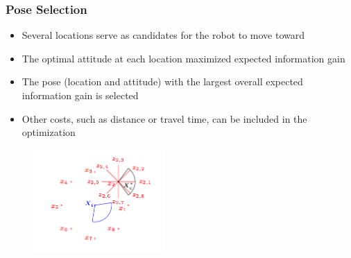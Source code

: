 \documentclass[11pt,professionalfonts,hyperref={pdftex,pdfpagemode=none,pdfstartview=FitH}]{beamer}
\begin{document}
\begin{frame}
\frametitle{Pose Selection}

\begin{minipage}[t]{7.0cm}
\begin{itemize}
	\item Several locations serve as candidates for the robot to move toward
	\item The optimal attitude at each location maximized expected information gain
	\item The pose (location and attitude) with the largest overall expected information gain is selected
	\item Other costs, such as distance or travel time, can be included in the optimization
\end{itemize}
\end{minipage}
\begin{minipage}[t]{3.0cm}
\vspace*{0.5cm}
\begin{figure}[!htbp]
	\centerline{
		\hspace*{1.0cm}
   		\includegraphics[width=5.0cm]{pose_selection}%
	}
\end{figure}
\end{minipage}


\end{frame}
\end{document}
